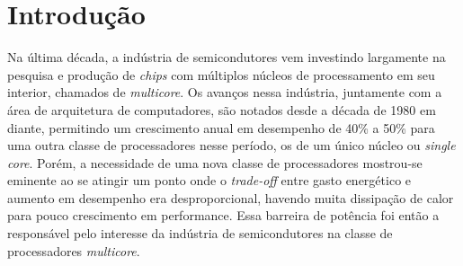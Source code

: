 
\newcommand{\multicore}{\textit{multicore}\xspace}
\newcommand{\chip}{\textit{chip}\xspace}
\newcommand{\chips}{\textit{chips}\xspace}
\newcommand{\singlecore}{\textit{single core}\xspace}
\newcommand{\tradeoff}{\textit{trade-off}\xspace}
\newcommand{\exascale}{\textit{Exascale}\xspace}
\newcommand{\greencomputing}{\textit{Green Computing}\xspace}  
\newcommand{\ranking}{\textit{ranking}\xspace}
\newcommand{\bench}{\textit{benchmark}\xspace}
\newcommand{\benchs}{\textit{benchmarks}\xspace}
\newcommand{\capb}{CAP Bench\xspace}
\newcommand{\etal}{\textit{et al}.\xspace}
\newcommand{\thread}{\textit{thread}\xspace}
\newcommand{\threads}{\textit{threads}\xspace}
\newcommand{\cache}{\textit{cache}\xspace}
\newcommand{\caches}{\textit{caches}\xspace}
\newcommand{\byte}{\textit{byte}\xspace}
\newcommand{\bytes}{\textit{bytes}\xspace}
\newcommand{\hardware}{\textit{hardware}\xspace}
\newcommand{\transistor}{\textit{transistor}\xspace}
\newcommand{\transistors}{\textit{transistors}\xspace}
\newcommand{\manycore}{\textit{manycore}\xspace}
\newcommand{\hardware}{\textit{hardware}\xspace}
\newcommand{\mppa}{MPPA-256\xspace}
\newcommand{\cluster}{\textit{cluster}\xspace}
\newcommand{\clusters}{\textit{clusters}\xspace}
\newcommand{\kernel}{\textit{kernel}\xspace}
\newcommand{\kernels}{\textit{kernels}\xspace}
\newcommand{\offset}{\textit{offset}\xspace}
\newcommand{\offsets}{\textit{offsets}\xspace}
\newcommand{\master}{\textit{master}\xspace}
\newcommand{\masters}{\textit{masters}\xspace}
\newcommand{\slave}{\textit{slave}\xspace}
\newcommand{\slaves}{\textit{slaves}\xspace}

\chapter{Introdução}
\label{ch:introdução}

Na última década, a indústria de semicondutores vem investindo largamente na pesquisa e produção de \chips com múltiplos núcleos de processamento em seu interior, chamados de \multicore. Os avanços nessa indústria, juntamente com a área de arquitetura de computadores, são notados desde a década de 1980 em diante, permitindo um crescimento anual em desempenho de 40\% a 50\% \cite{Larus2008} para uma outra classe de processadores nesse período, os de um único núcleo ou \singlecore. Porém, a necessidade de uma nova classe de processadores mostrou-se eminente ao se atingir um ponto onde o \tradeoff entre gasto energético e aumento em desempenho era desproporcional, havendo muita dissipação de calor para pouco crescimento em performance. Essa barreira de potência foi então a responsável pelo interesse da indústria de semicondutores na classe de processadores \multicore. 

